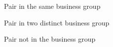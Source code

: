 		\begin{subfigure}[t]{.6\linewidth}
			\centering
			\tiny
			\resizebox{1\textwidth}{!}{
				

			}
			\caption{ Pair in the same business group}
		\end{subfigure}

		\begin{subfigure}[t]{.65\linewidth}
			\centering
			\tiny
			\resizebox{1\textwidth}{!}{
				
			}   
			\caption{ Pair in two distinct business group}
		\end{subfigure}
			\bigskip
		\begin{subfigure}[t]{1\linewidth}
			
			\resizebox{0.49\textwidth}{!}{
		
			}   
			\hfill
			\resizebox{0.49\textwidth}{!}{
					
				}
			\caption{ Pair not in the business group}
		\end{subfigure}
			
	